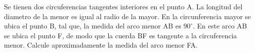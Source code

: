 
Se tienen dos circuferencias tangentes interiores en el punto A. La longitud del diametro de la menor es igual al radio de la mayor. En la circunferencia mayor se ubica el punto B, tal que, la medida del arco menor AB es $90^{\circ}$. En este arco AB se ubica el punto F, de modo que la cuerda BF es tangente a la circuferencia menor. Calcule aproximadamente la medida del arco menor FA.

